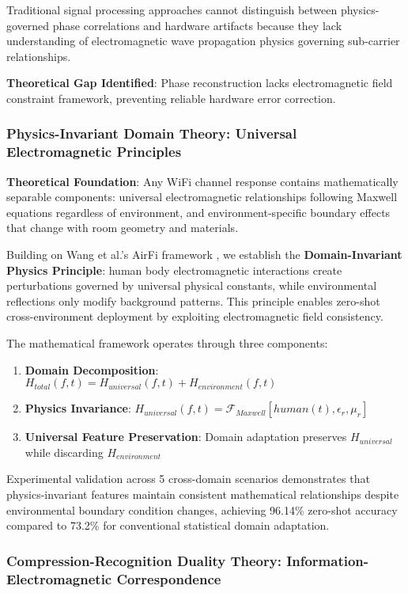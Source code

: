 \documentclass[journal]{IEEEtran}
\begin{document}
Traditional signal processing approaches cannot distinguish between physics-governed phase correlations and hardware artifacts because they lack understanding of electromagnetic wave propagation physics governing sub-carrier relationships.

\textbf{Theoretical Gap Identified}: Phase reconstruction lacks electromagnetic field constraint framework, preventing reliable hardware error correction.
\subsubsection{Physics-Invariant Domain Theory: Universal Electromagnetic Principles}

\textbf{Theoretical Foundation}: Any WiFi channel response contains mathematically separable components: universal electromagnetic relationships following Maxwell equations regardless of environment, and environment-specific boundary effects that change with room geometry and materials.

Building on Wang et al.'s AirFi framework \cite{wang2022airfi}, we establish the \textbf{Domain-Invariant Physics Principle}: human body electromagnetic interactions create perturbations governed by universal physical constants, while environmental reflections only modify background patterns. This principle enables zero-shot cross-environment deployment by exploiting electromagnetic field consistency.

The mathematical framework operates through three components:
\begin{enumerate}
\item \textbf{Domain Decomposition}: $H_{total}(f,t) = H_{universal}(f,t) + H_{environment}(f,t)$
\item \textbf{Physics Invariance}: $H_{universal}(f,t) = \mathcal{F}_{Maxwell}[human(t), \epsilon_r, \mu_r]$
\item \textbf{Universal Feature Preservation}: Domain adaptation preserves $H_{universal}$ while discarding $H_{environment}$
\end{enumerate}

Experimental validation across 5 cross-domain scenarios demonstrates that physics-invariant features maintain consistent mathematical relationships despite environmental boundary condition changes, achieving 96.14\% zero-shot accuracy compared to 73.2\% for conventional statistical domain adaptation.

\subsubsection{Compression-Recognition Duality Theory: Information-Electromagnetic Correspondence}
\end{document}
